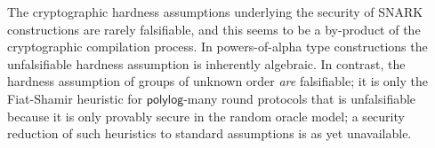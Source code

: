 \documentclass{article}
\theoremstyle{definition}
\begin{document}
The cryptographic hardness assumptions underlying the security of SNARK constructions are rarely falsifiable, and this seems to be a by-product of the cryptographic compilation process. In powers-of-alpha type constructions the unfalsifiable hardness assumption is inherently algebraic. In contrast, the hardness assumption of groups of unknown order \emph{are} falsifiable; it is only the Fiat-Shamir heuristic for $\mathsf{polylog}$-many round protocols that is unfalsifiable because it is only provably secure in the random oracle model; a security reduction of such heuristics to standard assumptions is as yet unavailable.

 

%

  

\appendix

 
\end{document}
